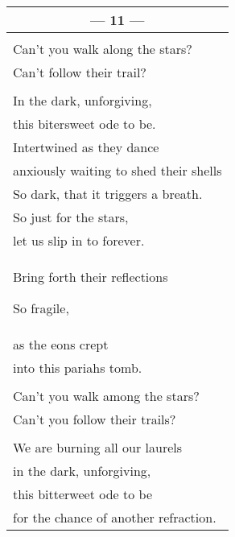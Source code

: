 \documentclass{article}
\begin{document}
\begin{center}
\begin{tabular}{l}
\multicolumn{1}{c}{\textbf{--- 11 ---}} \\ \hline
\\
Can't you walk along the stars? \\
Can't follow their trail? \\
\\
In the dark, unforgiving, \\
this bitersweet ode to be. \\
Intertwined as they dance \\
anxiously waiting to shed their shells \\
So dark, that it triggers a breath. \\
So just for the stars, \\
let us slip in to forever. \\
Bring forth their reflections 


So fragile, \\
as the eons crept \\
into this pariahs tomb. \\
\\
Can't you walk among the stars? \\
Can't you follow their trails? \\
\\
We are burning all our laurels \\
in the dark, unforgiving, \\
this bitterweet ode to be \\
for the chance of another refraction. \\


\end{tabular}
\end{center}
\end{document}

